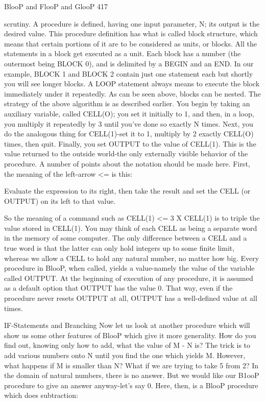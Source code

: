 BlooP and FlooP and GlooP                                                                 417

scrutiny. A procedure is defined, having one input parameter, N; its output is the desired
value.
         This procedure definition has what is called block structure, which means that
certain portions of it are to be considered as units, or blocks. All the statements in a block
get executed as a unit. Each block has a number (the outermost being BLOCK 0), and is
delimited by a BEGIN and an END. In our example, BLOCK 1 and BLOCK 2 contain
just one statement each but shortly you will see longer blocks. A LOOP statement always
means to execute the block immediately under it repeatedly. As can be seen above,
blocks can be nested.
         The strategy of the above algorithm is as described earlier. You begin by taking
an auxiliary variable, called CELL(O); you set it initially to 1, and then, in a loop, you
multiply it repeatedly by 3 until you've done so exactly N times. Next, you do the
analogous thing for CELL(1)-set it to 1, multiply by 2 exactly CELL(O) times, then
quit. Finally, you set OUTPUT to the value of CELL(1). This is the value returned to the
outside world-the only externally visible behavior of the procedure.
         A number of points about the notation should be made here. First, the meaning of
the left-arrow <= is this:

Evaluate the expression to its right, then take the result and set the CELL (or OUTPUT)
           on its left to that value.

So the meaning of a command such as CELL(1) <= 3 X CELL(1) is to triple the value
stored in CELL(1). You may think of each CELL as being a separate word in the
memory of some computer. The only difference between a CELL and a true word is that
the latter can only hold integers up to some finite limit, whereas we allow a CELL to
hold any natural number, no matter how big.
        Every procedure in BlooP, when called, yields a value-namely the value of the
variable called OUTPUT. At the beginning of execution of any procedure, it is assumed
as a default option that OUTPUT has the value 0. That way, even if the procedure never
resets OUTPUT at all, OUTPUT has a well-defined value at all times.

                           IF-Statements and Branching
Now let us look at another procedure which will show us some other features of BlooP
which give it more generality. How do you find out, knowing only how to add, what the
value of M - N is? The trick is to add various numbers onto N until you find the one
which yields M. However, what happens if M is smaller than N? What if we are trying to
take 5 from 2? In the domain of natural numbers, there is no answer. But we would like
our B1ooP procedure to give an answer anyway-let's say 0. Here, then, is a BlooP
procedure which does subtraction:




